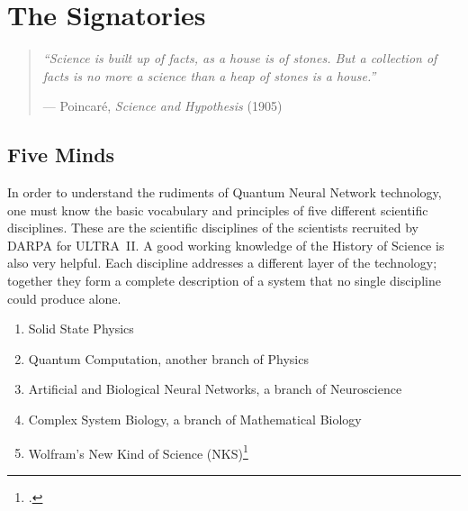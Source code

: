 
\chapter{The Signatories}
\label{pos20:the-network}

\begin{quote}\small\textit{%
``Science is built up of facts, as a house is of stones. But a collection of facts is no more a science than a heap of stones is a house.''%
}\par\raggedleft --- Poincar\'{e}, \textit{Science and Hypothesis} (1905)\end{quote}

\vspace{0.5cm}


\section*{Five Minds}
\label{pos20:five-minds}

In order to understand the rudiments of Quantum Neural Network technology, one must know the basic vocabulary and principles of five different scientific disciplines. These are the scientific disciplines of the scientists recruited by DARPA for ULTRA~II\@. A good working knowledge of the History of Science is also very helpful. Each discipline addresses a different layer of the technology; together they form a complete description of a system that no single discipline could produce alone.

\begin{enumerate}
\item Solid State Physics
\item Quantum Computation, another branch of Physics
\item Artificial and Biological Neural Networks, a branch of Neuroscience
\item Complex System Biology, a branch of Mathematical Biology
\item Wolfram's New Kind of Science (NKS)\footcite{wolfram2002}
\end{enumerate}

